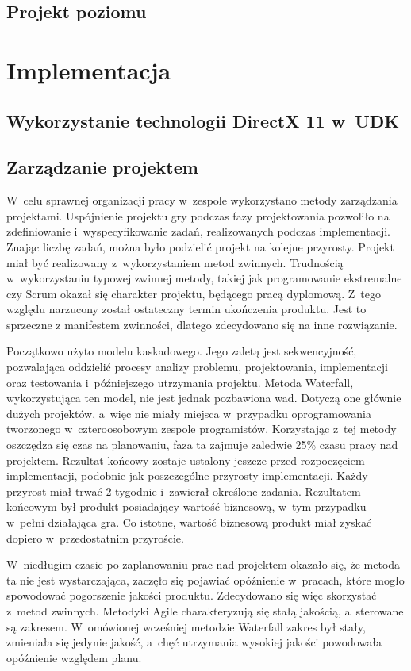 \subsection{Projekt poziomu}

\section{Implementacja}

\subsection{Wykorzystanie technologii DirectX 11 w~UDK}

\subsection{Zarządzanie projektem}
W~celu sprawnej organizacji pracy w~zespole wykorzystano metody zarządzania projektami. Uspójnienie projektu gry podczas fazy projektowania pozwoliło na zdefiniowanie i~wyspecyfikowanie zadań, realizowanych podczas implementacji. Znając liczbę zadań, można było podzielić projekt na kolejne przyrosty. Projekt miał być realizowany z~wykorzystaniem metod zwinnych. Trudnością w~wykorzystaniu typowej zwinnej metody, takiej jak programowanie ekstremalne czy Scrum okazał się charakter projektu, będącego pracą dyplomową. Z~tego względu narzucony został ostateczny termin ukończenia produktu. Jest to sprzeczne z manifestem zwinności, dlatego zdecydowano się na inne rozwiązanie.

Początkowo użyto modelu kaskadowego. Jego zaletą jest sekwencyjność, pozwalająca oddzielić procesy analizy problemu, projektowania, implementacji oraz testowania i~późniejszego utrzymania projektu. Metoda Waterfall, wykorzystująca ten model, nie jest jednak pozbawiona wad. 
Dotyczą one głównie dużych projektów, a~więc nie miały miejsca w~przypadku oprogramowania tworzonego w~czteroosobowym zespole programistów. Korzystając z~tej metody oszczędza się czas na planowaniu, faza ta zajmuje zaledwie 25\% czasu pracy nad projektem. Rezultat końcowy zostaje ustalony jeszcze przed rozpoczęciem implementacji, podobnie jak poszczególne przyrosty implementacji. Każdy przyrost miał trwać 2 tygodnie i~zawierał określone zadania. Rezultatem końcowym był produkt posiadający wartość biznesową, w~tym przypadku - w~pełni działająca gra. Co istotne, wartość biznesową produkt miał zyskać dopiero w~przedostatnim przyroście.

W~niedługim czasie po zaplanowaniu prac nad projektem okazało się, że metoda ta nie jest wystarczająca, zaczęło się pojawiać opóźnienie w~pracach, które mogło spowodować pogorszenie jakości produktu. Zdecydowano się więc skorzystać z~metod zwinnych. Metodyki Agile charakteryzują się stałą jakością, a~sterowane są zakresem. W~omówionej wcześniej metodzie Waterfall zakres był stały, zmieniała się jedynie jakość, a~chęć utrzymania wysokiej jakości powodowała opóźnienie względem planu. 

